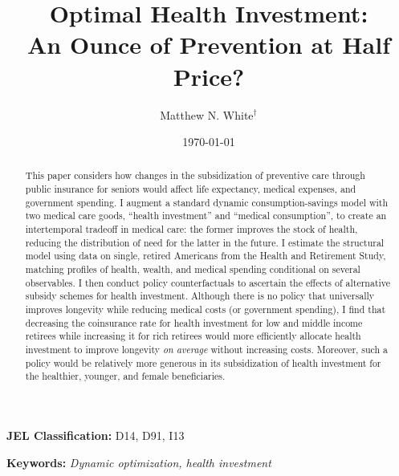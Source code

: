 \documentclass[12pt,pdftex,letterpaper]{article}
\begin{document}
\begin{singlespace}
\title{Optimal Health Investment:\\An Ounce of Prevention at Half Price?}

\author{Matthew N. White$^\dagger$}

\date{\today}

\maketitle

\begin{abstract}
This paper considers how changes in the subsidization of preventive care through public insurance for seniors would affect life expectancy, medical expenses, and government spending.  I augment a standard dynamic consumption-savings model with two medical care goods, ``health investment'' and ``medical consumption'', to create an intertemporal tradeoff in medical care: the former improves the stock of health, reducing the distribution of need for the latter in the future.  I estimate the structural model using data on single, retired Americans from the Health and Retirement Study, matching profiles of health, wealth, and medical spending conditional on several observables.  I then conduct policy counterfactuals to ascertain the effects of alternative subsidy schemes for health investment.  Although there is no policy that universally improves longevity while reducing medical costs (or government spending), I find that decreasing the coinsurance rate for health investment for low and middle income retirees while increasing it for rich retirees would more efficiently allocate health investment to improve longevity \textit{on average} without increasing costs.  Moreover, such a policy would be relatively more generous in its subsidization of health investment for the healthier, younger, and female beneficiaries.
\end{abstract}

\end{singlespace}

\textbf{JEL Classification:} D14, D91, I13

\vspace{0.5cm}

\textbf{Keywords:} \textit{Dynamic optimization, health investment}
\end{document}

